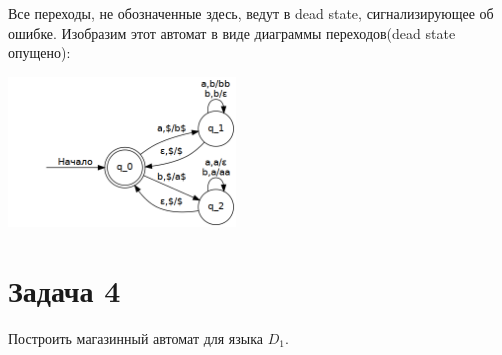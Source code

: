 \documentclass[11pt]{article}
\begin{document}
Все переходы, не обозначенные здесь, ведут в dead state, сигнализирующее об ошибке.
Изобразим этот автомат в виде диаграммы переходов(dead state опущено):
\begin{center}
\includegraphics[height=150px]{diag1.png}
\end{center}
\section{Задача 4}
\label{sec:org629bba3}
Построить магазинный автомат для языка \(D_1\).
\end{document}
